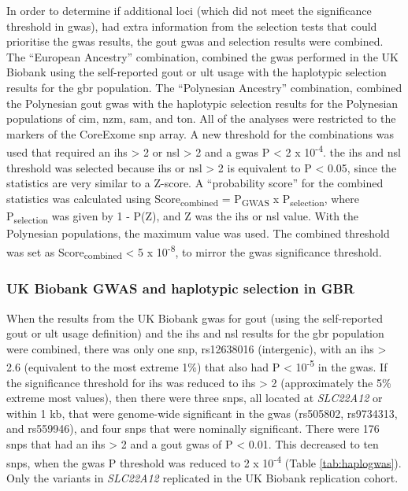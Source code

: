 \documentclass[twoside,openright]{report}
\begin{document}
In order to determine if additional loci (which did not meet the
significance threshold in \gls{gwas}), had extra information from the
selection tests that could prioritise the \gls{gwas} results, the gout
\gls{gwas} and selection results were combined. The ``European
Ancestry'' combination, combined the \gls{gwas} performed in the UK
Biobank using the self-reported gout or \gls{ult} usage with the
haplotypic selection results for the \gls{gbr} population. The
``Polynesian Ancestry'' combination, combined the Polynesian gout
\gls{gwas} with the haplotypic selection results for the Polynesian
populations of \gls{cim}, \gls{nzm}, \gls{sam}, and \gls{ton}. All of
the analyses were restricted to the markers of the CoreExome \gls{snp}
array. A new threshold for the combinations was used that required an
\textbar{}\gls{ihs}\textbar{} \textgreater{} 2 or
\textbar{}\gls{nsl}\textbar{} \textgreater{} 2 and a \gls{gwas} P
\textless{} 2 x 10\textsuperscript{-4}. the \gls{ihs} and \gls{nsl}
threshold was selected because \textbar{}\gls{ihs}\textbar{} or
\textbar{}\gls{nsl}\textbar{} \textgreater{} 2 is equivalent to P
\textless{} 0.05, since the statistics are very similar to a Z-score. A
``probability score'' for the combined statistics was calculated using
Score\textsubscript{combined} = P\textsubscript{GWAS} x
P\textsubscript{selection}, where P\textsubscript{selection} was given
by 1 - P(\textbar{}Z\textbar{}), and Z was the \gls{ihs} or \gls{nsl}
value. With the Polynesian populations, the maximum
\textbar{}value\textbar{} was used. The combined threshold was set as
Score\textsubscript{combined} \textless{} 5 x 10\textsuperscript{-8}, to
mirror the \gls{gwas} significance threshold.

\subsubsection{UK Biobank GWAS and haplotypic selection in
GBR}\label{uk-biobank-gwas-and-haplotypic-selection-in-gbr}

When the results from the UK Biobank \gls{gwas} for gout (using the
self-reported gout or \gls{ult} usage definition) and the \gls{ihs} and
\gls{nsl} results for the \gls{gbr} population were combined, there was
only one \gls{snp}, rs12638016 (intergenic), with an
\textbar{}\gls{ihs}\textbar{} \textgreater{} 2.6 (equivalent to the most
extreme 1\%) that also had P \textless{} 10\textsuperscript{-5} in the
\gls{gwas}. If the significance threshold for \gls{ihs} was reduced to
\textbar{}\gls{ihs}\textbar{} \textgreater{} 2 (approximately the 5\%
extreme most values), then there were three \glspl{snp}, all located at
\emph{SLC22A12} or within 1 kb, that were genome-wide significant in the
\gls{gwas} (rs505802, rs9734313, and rs559946), and four \glspl{snp}
that were nominally significant. There were 176 \glspl{snp} that had an
\textbar{}\gls{ihs}\textbar{} \textgreater{} 2 and a gout \gls{gwas} of
P \textless{} 0.01. This decreased to ten \glspl{snp}, when the
\gls{gwas} P threshold was reduced to 2 x 10\textsuperscript{-4} (Table
\ref{tab:haplogwas}). Only the variants in \emph{SLC22A12} replicated in
the UK Biobank replication cohort.
\end{document}
